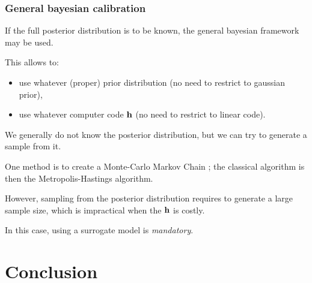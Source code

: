 \documentclass[aspectratio=169]{beamer}
\begin{document}
\begin{frame}
\frametitle{General bayesian calibration}

If the full posterior distribution is to be known, the 
general bayesian framework may be used. 

This allows to:
\begin{itemize}
\item use whatever (proper) prior distribution (no need to restrict to gaussian 
prior),
\item use whatever computer code ${\bf h}$ (no need to restrict to linear 
code).
\end{itemize}

We generally do not know the posterior distribution, but we can 
try to generate a sample from it. 

One method is to create a Monte-Carlo Markov Chain ; the classical algorithm is then the 
Metropolis-Hastings algorithm. 

However, sampling from the posterior distribution 
requires to generate a large sample size, which is impractical 
when the ${\bf h}$ is costly. 

In this case, using a surrogate model is \emph{mandatory}. 

\end{frame}


\section{Conclusion}

\end{document}

